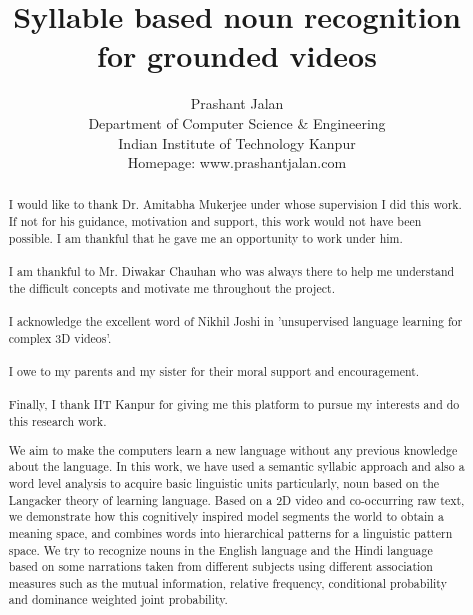 \documentclass[12pt, a4paper]{report}
\begin{document}
\title{Syllable based noun recognition\\for grounded videos}
\author{Prashant Jalan
\\Department of Computer Science \& Engineering\\
Indian Institute of Technology Kanpur\\
Homepage: www.prashantjalan.com}

\maketitle
\tableofcontents

\renewcommand{\abstractname}{Acknowledgements}
\begin{abstract}
I would like to thank Dr. Amitabha Mukerjee under whose supervision I did this work. If not for his guidance, motivation and support, this work would not have been possible. I am thankful that he gave me an opportunity to work under him.\\
\\
I am thankful to Mr. Diwakar Chauhan who was always there to help me understand the difficult concepts and motivate me throughout the project.\\
\\
I acknowledge the excellent word of Nikhil Joshi in 'unsupervised language learning for complex 3D videos'.\\
\\
I owe to my parents and my sister for their moral support and encouragement.\\
\\
Finally, I thank IIT Kanpur for giving me this platform to pursue my interests and do this research work.



\end{abstract}

\renewcommand{\abstractname}{Abstract}
\begin{abstract}
We aim to make the computers learn a new language without any previous knowledge about the language. In this work, we have used a semantic syllabic approach and also a word level analysis to acquire basic linguistic units particularly, noun based on the Langacker\cite{} theory of learning language. Based on a 2D video and co-occurring raw text, we demonstrate how this cognitively inspired model segments the world to obtain a meaning space, and combines words into hierarchical patterns for a linguistic pattern space. We try to recognize nouns in the English language and the Hindi language based on some narrations taken from different subjects using different association measures such as the mutual information, relative frequency, conditional probability and dominance weighted joint probability.
\end{abstract}
\end{document}
